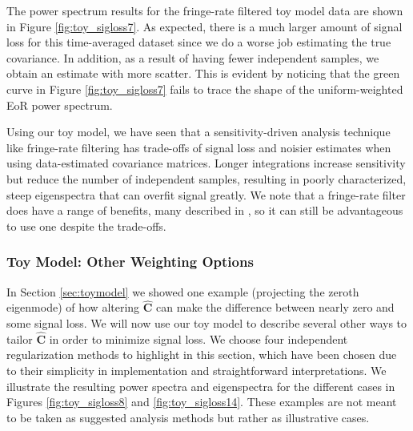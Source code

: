 \documentclass[preprint2,numberedappendix,tighten]{aastex6}  %
\begin{document}
The power spectrum results for the fringe-rate filtered toy model data are shown in Figure \ref{fig:toy_sigloss7}. As 
expected, there is a much larger amount of signal loss for this time-averaged dataset since we do a worse job estimating the true covariance. In addition, as a result of having fewer independent samples, we obtain an estimate with more scatter. This is evident by noticing that the 
green curve in Figure \ref{fig:toy_sigloss7} fails to trace the shape of the uniform-weighted EoR power spectrum.

Using our toy model, we have seen that a sensitivity-driven analysis technique like fringe-rate filtering has trade-offs of signal 
loss and noisier estimates when using data-estimated covariance matrices. Longer integrations increase sensitivity but reduce 
the number of independent samples, resulting in poorly characterized, steep eigenspectra that can overfit signal greatly. We 
note that a fringe-rate filter does have a range of benefits, many described in \citet{parsons_et_al2016}, so it can still be 
advantageous to use one despite the trade-offs.

\subsubsection{Toy Model: Other Weighting Options}
\label{sec:otherweight}

In Section \ref{sec:toymodel} we showed one example (projecting the zeroth eigenmode) of how altering $\widehat{\textbf{C}}$ can 
make the difference between nearly zero and some signal loss. We will now use our toy model to describe several other ways to tailor $\widehat{\textbf{C}}$ 
in order to minimize signal loss. We choose four independent regularization methods to highlight in this section, which have 
been chosen due to their simplicity in implementation and straightforward interpretations. We illustrate the resulting power 
spectra and eigenspectra for the different cases in Figures \ref{fig:toy_sigloss8} and \ref{fig:toy_sigloss14}. These examples are not meant to be taken as suggested analysis methods but rather as illustrative cases. 
\end{document}
